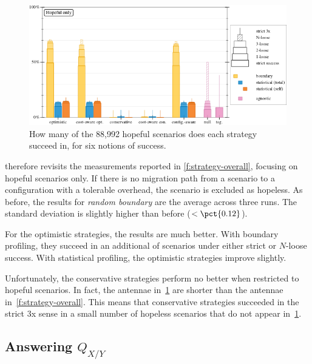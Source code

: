 \begin{figure}[t]
  \includegraphics[width=\columnwidth]{data/strategy-overall-hopeful.pdf}
  \caption{How many of the 88,992 hopeful scenarios does each strategy succeed in, for six notions of success.}
  \label{f:strategy-hope}
\end{figure}

 therefore revisits the measurements reported in
\cref{f:strategy-overall}, focusing on hopeful scenarios only.  If there is no
migration path from a scenario to a configuration with a tolerable overhead, the
scenario is excluded as hopeless.  As before, the results for \emph{random
boundary} are the average across three runs.  The standard deviation is slightly
higher than before ($<\pct{0.12}$).

For the optimistic strategies, the results are much better.
With boundary profiling, they succeed in an additional  of
scenarios under either strict or $N$-loose success.
With statistical profiling, the optimistic strategies
improve slightly.

Unfortunately, the conservative strategies perform no better when restricted
to hopeful scenarios.
In fact, the antennae
in~\cref{f:strategy-hope} are shorter than the antennae
in~\cref{f:strategy-overall}.  This means that conservative strategies
succeeded in the strict 3x sense in a small number of hopeless scenarios that
do not appear in~\cref{f:strategy-hope}.


\subsection{Answering $Q_{X/Y}$} \label{subsec:hh} \label{s:hh}

